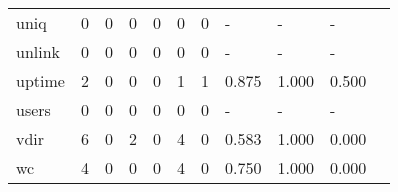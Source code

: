 \begin{longtable}{lp{1.20cm}p{1.20cm}p{1.20cm}p{1.20cm}p{1.20cm}p{1.20cm}p{1.20cm}p{1.20cm}p{1.20cm}p{1.20cm}}
uniq      &                                     0 &                                                  0 &                                                  0 &                                                  0 &                                                  0 &                                                  0 &                                             - &                                                  - &                                                  - \\
unlink    &                                     0 &                                                  0 &                                                  0 &                                                  0 &                                                  0 &                                                  0 &                                             - &                                                  - &                                                  - \\
uptime    &                                     2 &                                                  0 &                                                  0 &                                                  0 &                                                  1 &                                                  1 &                                         0.875 &                                              1.000 &                                              0.500 \\
users     &                                     0 &                                                  0 &                                                  0 &                                                  0 &                                                  0 &                                                  0 &                                             - &                                                  - &                                                  - \\
vdir      &                                     6 &                                                  0 &                                                  2 &                                                  0 &                                                  4 &                                                  0 &                                         0.583 &                                              1.000 &                                              0.000 \\
wc        &                                     4 &                                                  0 &                                                  0 &                                                  0 &                                                  4 &                                                  0 &                                         0.750 &                                              1.000 &                                              0.000 \\

\end{longtable}
